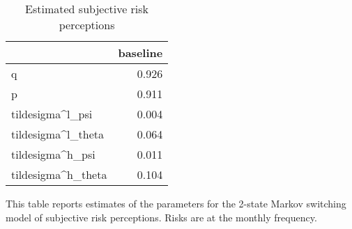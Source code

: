 
\begin{table}[p]
\centering
\begin{adjustbox}{width=0.3\textwidth}
\begin{threeparttable}
\caption{Estimated subjective risk perceptions}
\label{tab:PRMarkovEst}\begin{tabular}{lr}
\toprule
{} &  baseline \\
\midrule
q                  &     0.926 \\
p                  &     0.911 \\
tildesigma\textasciicircum l\_psi   &     0.004 \\
tildesigma\textasciicircum l\_theta &     0.064 \\
tildesigma\textasciicircum h\_psi   &     0.011 \\
tildesigma\textasciicircum h\_theta &     0.104 \\
\bottomrule
\end{tabular}
\begin{tablenotes}\item This table reports estimates of the parameters 
for the 2-state Markov switching model of subjective risk perceptions. Risks are at the monthly frequency. 
\end{tablenotes}
\end{threeparttable}
\end{adjustbox}
\end{table}